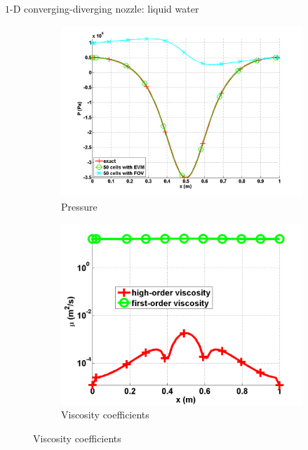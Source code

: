 \documentclass[xcolor=dvipsnames,10pt]{beamer}
\begin{document}
\begin{frame}{$1$-D converging-diverging nozzle: liquid water}
\begin{figure}[H]
        \begin{subfigure}[b]{0.37\textwidth}
                \centering
                \includegraphics[width=\textwidth]{../figures/liquid_pressure_numerical_and_exact_50.png}
                \caption{Pressure}
        \end{subfigure}     
        \begin{subfigure}[b]{0.37\textwidth}
                \centering
                \includegraphics[width=\textwidth]{../figures/liquid_viscosity_numerical50.png}
                \caption{Viscosity coefficients}
        \end{subfigure}
\end{figure}
\end{frame}
\end{document}
